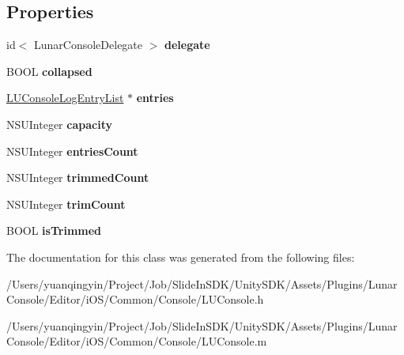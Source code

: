 \subsection*{Properties}
\begin{DoxyCompactItemize}
\item 
\mbox{\label{interface_l_u_console_acad82b146ecb076c7b5339cc5f66db0f}} 
id$<$ Lunar\+Console\+Delegate $>$ {\bfseries delegate}
\item 
\mbox{\label{interface_l_u_console_a7164e1dc6c2301cf109dab87f894969f}} 
B\+O\+OL {\bfseries collapsed}
\item 
\mbox{\label{interface_l_u_console_a703e9a5859ca49f7fc25547a2b58e07d}} 
\mbox{\hyperlink{interface_l_u_console_log_entry_list}{L\+U\+Console\+Log\+Entry\+List}} $\ast$ {\bfseries entries}
\item 
\mbox{\label{interface_l_u_console_a6a1f6f88cdb4169227b2f83fda376938}} 
N\+S\+U\+Integer {\bfseries capacity}
\item 
\mbox{\label{interface_l_u_console_a06d83a6ce1e1eb2d9adfd00c85684454}} 
N\+S\+U\+Integer {\bfseries entries\+Count}
\item 
\mbox{\label{interface_l_u_console_aa1bbf997bb9452b9deff9fed19571b71}} 
N\+S\+U\+Integer {\bfseries trimmed\+Count}
\item 
\mbox{\label{interface_l_u_console_a684010d6969ea768ef2b61a99fda58ab}} 
N\+S\+U\+Integer {\bfseries trim\+Count}
\item 
\mbox{\label{interface_l_u_console_a11422f9e5c6f120bd7199769ab2ebf83}} 
B\+O\+OL {\bfseries is\+Trimmed}
\end{DoxyCompactItemize}


The documentation for this class was generated from the following files\+:\begin{DoxyCompactItemize}
\item 
/\+Users/yuanqingyin/\+Project/\+Job/\+Slide\+In\+S\+D\+K/\+Unity\+S\+D\+K/\+Assets/\+Plugins/\+Lunar\+Console/\+Editor/i\+O\+S/\+Common/\+Console/L\+U\+Console.\+h\item 
/\+Users/yuanqingyin/\+Project/\+Job/\+Slide\+In\+S\+D\+K/\+Unity\+S\+D\+K/\+Assets/\+Plugins/\+Lunar\+Console/\+Editor/i\+O\+S/\+Common/\+Console/L\+U\+Console.\+m\end{DoxyCompactItemize}
